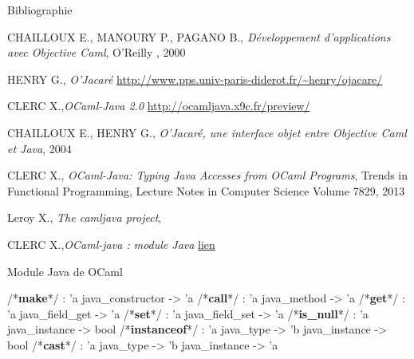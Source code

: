 \documentclass[xcolor={table,dvipsnames}]{beamer}
\begin{document}
\begin{frame}{Bibliographie}

  \begin{thebibliography}{}
   CHAILLOUX E., MANOURY P., PAGANO B., \emph{Développement
    d'applications avec Objective Caml}, O'Reilly
    , 2000

  \bibitem{}  HENRY G., \emph{O’Jacaré} \url{http://www.pps.univ-paris-diderot.fr/~henry/ojacare/}

  \bibitem{}  CLERC X.,\emph{OCaml-Java 2.0} \url{http://ocamljava.x9c.fr/preview/}

  \bibitem{} CHAILLOUX E., HENRY G., \emph{O’Jacaré, une interface objet
    entre Objective Caml et Java}, 2004

  \bibitem{} CLERC X., \emph{OCaml-Java: Typing Java Accesses from OCaml
    Programs}, Trends in Functional Programming, Lecture Notes in
    Computer Science Volume 7829,
    2013

   Leroy X., \emph{The camljava project},

   CLERC X.,\emph{OCaml-java : module Java} \href{http://ocamljava.x9c.fr/preview/javalib/index.html}{lien}

  \end{thebibliography}
\end{frame}



\begin{frame}[fragile]{Module Java de OCaml}
\begin{OCamlEx}
/*\textbf{make}*/ : 'a java_constructor -> 'a 
/*\textbf{call}*/ : 'a java_method -> 'a 
/*\textbf{get}*/ : 'a java_field_get -> 'a 
/*\textbf{set}*/ : 'a java_field_set -> 'a 
/*\textbf{is\_null}*/ : 'a java_instance -> bool 
/*\textbf{instanceof}*/ : 'a java_type -> 'b java_instance -> bool
/*\textbf{cast}*/ : 'a java_type -> 'b java_instance -> 'a
\end{OCamlEx}
\end{frame}
\end{document}

